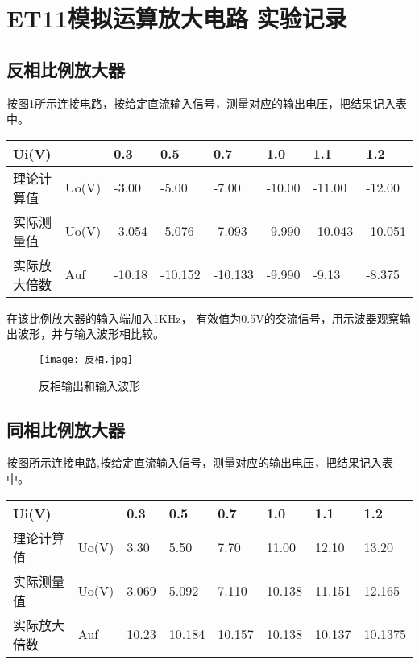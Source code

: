 \documentclass[dvipsnames, svgnames,a4paper,11pt]{article}
\begin{document}
	\section{ET11模拟运算放大电路 \quad\heiti 实验记录}
	
	\subsection{反相比例放大器}
	
	按图1所示连接电路，按给定直流输入信号，测量对应的输出电压，把结果记入表中。 
	\begin{table}[!ht]
		\centering
		\begin{tabular}{|l|l|l|l|l|l|l|l|}
		\hline
		Ui(V) & & 0.3 & 0.5 & 0.7 & 1.0 & 1.1 & 1.2 \\ \hline
		理论计算值 & Uo(V) & -3.00 & -5.00 & -7.00 & -10.00 & -11.00 & -12.00 \\ \hline
		实际测量值 & Uo(V) & -3.054 & -5.076 & -7.093 & -9.990 & -10.043 & -10.051 \\ \hline
		实际放大倍数 & Auf & -10.18 & -10.152 & -10.133 & -9.990 & -9.13 & -8.375 \\ \hline
		\end{tabular}
	\end{table}
	
	在该比例放大器的输入端加入1KHz， 有效值为0.5V的交流信号，用示波器观察输出波形，并与输入波形相比较。
	\begin{figure}[{H}]
		\centering
		\texttt{[image: 反相.jpg]}
		\caption{反相输出和输入波形}
		\label{}
	\end{figure}
	\subsection{同相比例放大器}
	按图所示连接电路,按给定直流输入信号，测量对应的输出电压，把结果记入表中。
	\begin{table}[!ht]
		\centering
		\begin{tabular}{|l|l|l|l|l|l|l|l|}
		\hline
		Ui(V) & & 0.3 & 0.5 & 0.7 & 1.0 & 1.1 & 1.2 \\ \hline
		理论计算值 & Uo(V) & 3.30 & 5.50 & 7.70 & 11.00 & 12.10 & 13.20 \\ \hline
		实际测量值 & Uo(V) & 3.069 & 5.092 & 7.110 & 10.138 & 11.151 & 12.165 \\ \hline
		实际放大倍数 & Auf & 10.23 & 10.184 & 10.157 & 10.138 & 10.137 & 10.1375 \\ \hline
		\end{tabular}
	\end{table}
\end{document}
